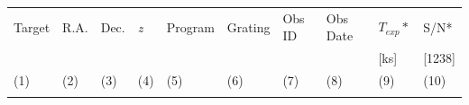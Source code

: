 \documentclass[twocolumn,tighten]{aastex6}
\begin{document}
\begin{table}[ht]\footnotesize
\begin{center}
\begin{tabular}{l l l l l l l l l l}
 \hline \hline
  Target 					& R.A. 		& Dec. 		 & \textit{z}	  & Program 	  & Grating 	   & Obs ID 	    & Obs Date 	     & $T_{exp}*$     & S/N*  \\ 
  	    					& 	       		&	  		 & 		  	  & 		    	  & 		  	   & 		  	    & 		     	     & 	        [ks]         & [1238] \\ 
 \scriptsize (1)  				& \scriptsize (2) & \scriptsize (3) & \scriptsize (4) & \scriptsize (5) & \scriptsize (6) & \scriptsize  (7) & \scriptsize (8) & \scriptsize (9) & \scriptsize (10)  \\ \hline \hline
\\
    

\end{tabular}
\end{center}
\end{table}
\end{document}
